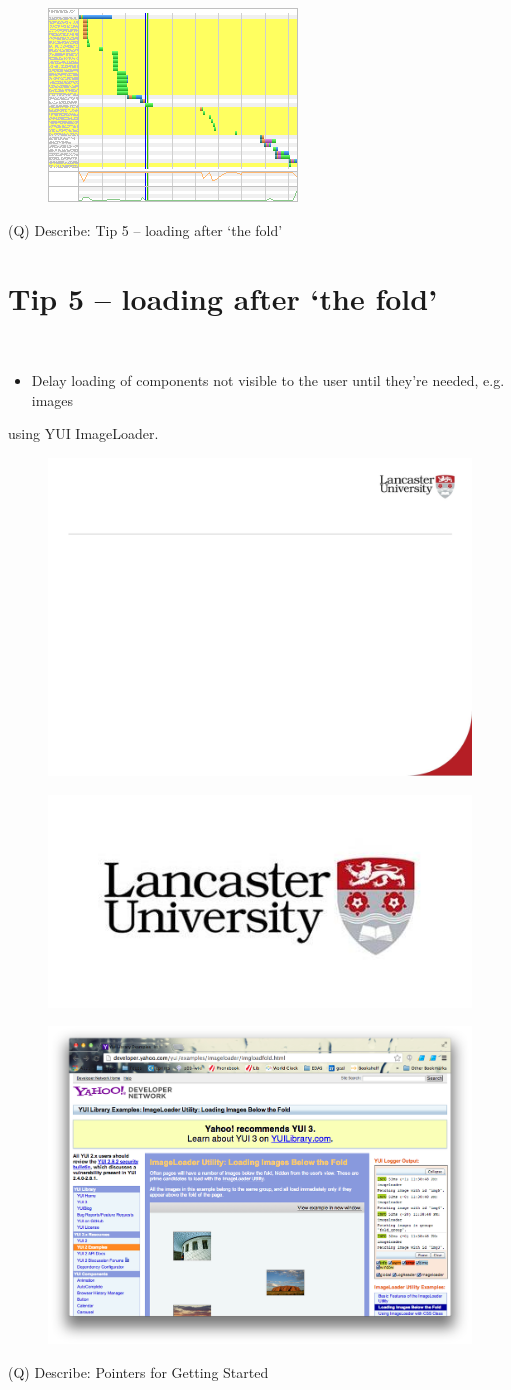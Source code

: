 \documentclass[12pt]{article}
\begin{document}
\begin{figure}[H]
\includegraphics[width=0.5\linewidth]{page55-image-4.png}
\end{figure}
\clearpage
(Q)
Describe: Tip 5 – loading after ‘the fold’
\clearpage
\section{Tip 5 – loading after ‘the fold’}
\\
\begin{itemize}
  \item Delay loading of components not visible to the user until they’re needed, e.g. images 
\end{itemize}
using YUI ImageLoader.\\
\begin{figure}[H]
\includegraphics[width=0.5\linewidth]{page56-image-1.png}
\end{figure}
\begin{figure}[H]
\includegraphics[width=0.5\linewidth]{page56-image-2.png}
\end{figure}
\begin{figure}[H]
\includegraphics[width=0.5\linewidth]{page56-image-3.png}
\end{figure}
\clearpage
(Q)
Describe: Pointers for Getting Started
\clearpage
\end{document}
